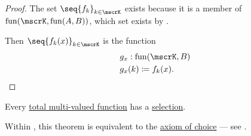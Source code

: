 \begin{proof}
   The set \( \seq{ f_k }_{k \in \mscrK} \) exists because it is a member of \( \fun(\mscrK, \fun(A, B)) \), which set exists by .

   Then \( \seq{ f_k(x) }_{k \in \mscrK} \) is the function
   \begin{equation*}
     \begin{aligned}
       &g_x: \fun(\mscrK, B) \\
       &g_x(k) \coloneqq f_k(x).
     \end{aligned}
   \end{equation*}
\end{proof}

\begin{theorem}\label{thm:existence_of_multi_valued_function_selection}
  Every \hyperref[def:multi_valued_function/total]{total multi-valued function} has a \hyperref[def:function/selection]{selection}.

  Within \hyperref[def:zfc]{}, this theorem is equivalent to the \hyperref[def:zfc/choice]{axiom of choice} --- see .
\end{theorem}
